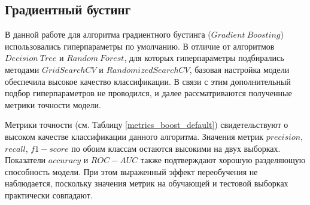 \subsection{Градиентный бустинг}

В данной работе для алгоритма градиентного бустинга ($Gradient\ Boosting$) использовались гиперпараметры по умолчанию. В отличие от алгоритмов $Decision\ Tree$ и $Random\ Forest$, для которых гиперпараметры подбирались методами $GridSearchCV$ и $RandomizedSearchCV$, базовая настройка модели обеспечила высокое качество классификации. В связи с этим дополнительный подбор гиперпараметров не проводился, и далее рассматриваются полученные метрики точности модели.

Метрики точности (см. Таблицу  \ref{metrics_boost_default}) свидетельствуют о высоком качестве классификации данного алгоритма. Значения метрик $precision$, $recall$, $f1-score$ по обоим классам остаются высокими на двух выборках. Показатели $accuracy$ и $ROC-AUC$ также подтверждают хорошую разделяющую способность модели. При этом выраженный эффект переобучения не наблюдается, поскольку значения метрик на обучающей и тестовой выборках практически совпадают. 
